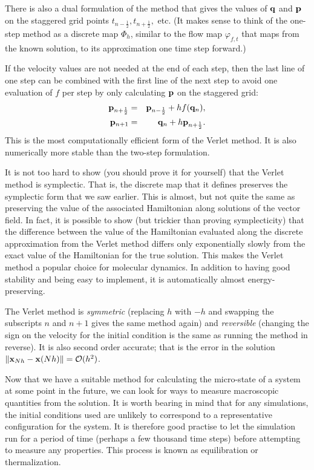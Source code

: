 There is also a dual formulation of the method that gives the values of ${\bf q}$ and ${\bf p}$ on the staggered grid points $t_{n-\frac12},t_{n+\frac12},$ etc.
(It makes sense to think of the one-step method as a discrete map $\Phi_h$, similar to the flow map $\varphi_{f,t}$ that maps from the known solution, to its approximation one time step forward.)

If the velocity values are not needed at the end of each step, then the last line of one step can be combined with the first line of the next step to avoid one evaluation of $f$ per step by only calculating ${\bf p}$ on the staggered grid:
\begin{eqnarray*}
	{\bf p}_{n+\frac12} &=& {\bf p}_{n-\frac12}+hf({\bf q}_n),\\
	{\bf p}_{n+1} &=& {\bf q}_n +h{\bf p}_{n+\frac12}.
\end{eqnarray*}
This is the most computationally efficient form of the Verlet method. It is also numerically more stable than the two-step formulation.

It is not too hard to show (you should prove it for yourself) that the Verlet method is symplectic. That is, the discrete map that it defines preserves the symplectic form that we saw earlier. This is almost, but not quite the same as preserving the value of the associated Hamiltonian along solutions of the vector field. In fact, it is possible to show (but trickier than proving symplecticity) that the difference between the value of the Hamiltonian evaluated along the discrete approximation from the Verlet method differs only exponentially slowly from the exact value of the Hamiltonian for the true solution. This makes the Verlet method a popular choice for molecular dynamics. In addition to having good stability and being easy to implement, it is automatically almost energy-preserving.

The Verlet method is \emph{symmetric} (replacing $h$ with $-h$ and swapping the subscripts $n$ and $n+1$ gives the same method again) and \emph{reversible} (changing the sign on the velocity for the initial condition is the same as running the method in reverse). It is also second order accurate; that is the error in the solution $\|{\bf x}_{Nh}-{\bf x}(Nh)\|=\mathcal{O}(h^2)$.

Now that we have a suitable method for calculating the micro-state of a system at some point in the future, we can look for ways to measure macroscopic quantities from the solution. It is worth bearing in mind that for any simulations, the initial conditions used are unlikely to correspond to a representative configuration for the system. It is therefore good practise to let the simulation run for a period of time (perhaps a few thousand time steps) before attempting to measure any properties. This process is known as equilibration or thermalization.

